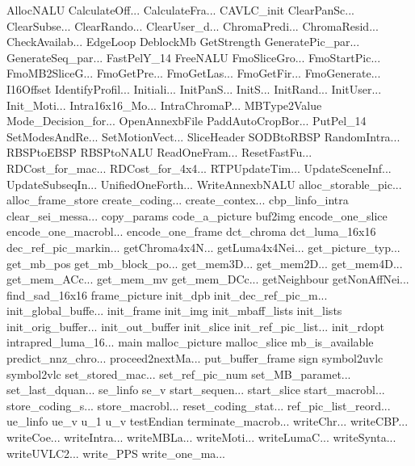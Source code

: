 AllocNALU
CalculateOff...
CalculateFra...
CAVLC_init
ClearPanSc...
ClearSubse...
ClearRando...
ClearUser_d...
ChromaPredi...
ChromaResid...
CheckAvailab...
EdgeLoop
DeblockMb
GetStrength
GeneratePic_par...
GenerateSeq_par...
FastPelY_14
FreeNALU
FmoSliceGro...
FmoStartPic...
FmoMB2SliceG...
FmoGetPre...
FmoGetLas...
FmoGetFir...
FmoGenerate...
I16Offset
IdentifyProfil...
Initiali...
InitPanS...
InitS...
InitRand...
InitUser...
Init_Moti...
Intra16x16_Mo...
IntraChromaP...
MBType2Value
Mode_Decision_for...
OpenAnnexbFile
PaddAutoCropBor...
PutPel_14
SetModesAndRe...
SetMotionVect...
SliceHeader
SODBtoRBSP
RandomIntra...
RBSPtoEBSP
RBSPtoNALU
ReadOneFram...
ResetFastFu...
RDCost_for_mac...
RDCost_for_4x4...
RTPUpdateTim...
UpdateSceneInf...
UpdateSubseqIn...
UnifiedOneForth...
WriteAnnexbNALU
alloc_storable_pic...
alloc_frame_store
create_coding...
create_contex...
cbp_linfo_intra
clear_sei_messa...
copy_params
code_a_picture
buf2img
encode_one_slice
encode_one_macrobl...
encode_one_frame
dct_chroma
dct_luma_16x16
dec_ref_pic_markin...
getChroma4x4N...
getLuma4x4Nei...
get_picture_typ...
get_mb_pos
get_mb_block_po...
get_mem3D...
get_mem2D...
get_mem4D...
get_mem_ACc...
get_mem_mv
get_mem_DCc...
getNeighbour
getNonAffNei...
find_sad_16x16
frame_picture
init_dpb
init_dec_ref_pic_m...
init_global_buffe...
init_frame
init_img
init_mbaff_lists
init_lists
init_orig_buffer...
init_out_buffer
init_slice
init_ref_pic_list...
init_rdopt
intrapred_luma_16...
main
malloc_picture
malloc_slice
mb_is_available
predict_nnz_chro...
proceed2nextMa...
put_buffer_frame
sign
symbol2uvlc
symbol2vlc
set_stored_mac...
set_ref_pic_num
set_MB_paramet...
set_last_dquan...
se_linfo
se_v
start_sequen...
start_slice
start_macrobl...
store_coding_s...
store_macrobl...
reset_coding_stat...
ref_pic_list_reord...
ue_linfo
ue_v
u_1
u_v
testEndian
terminate_macrob...
writeChr...
writeCBP...
writeCoe...
writeIntra...
writeMBLa...
writeMoti...
writeLumaC...
writeSynta...
writeUVLC2...
write_PPS
write_one_ma...
